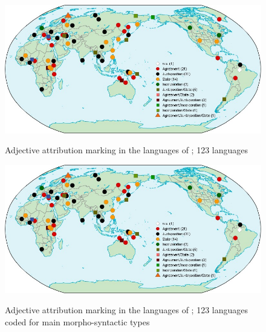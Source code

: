 \newpage
\begin{figure}
    \begin{minipage}[b][8cm][c]{2\baselineskip}
        \caption[Adjective attribution marking, Europe]{Adjective attribution marking in the languages of ; 123 languages}
    \end{minipage}
\includegraphics[width=\textheight,angle=90]{figures/WorldMapTyp.jpg}%
\label{EUMap}
\end{figure}

\newpage
\begin{figure}
    \begin{minipage}[b][8cm][c]{2\baselineskip}
        \caption[Adjective attribution marking, Europe, main types]{Adjective attribution marking in the languages of ; 123 languages coded for main morpho-syntactic types}
    \end{minipage}
\includegraphics[width=\textheight,angle=90]{figures/WorldMapTyp.jpg}%
\label{EUMapTyp}
\end{figure}
